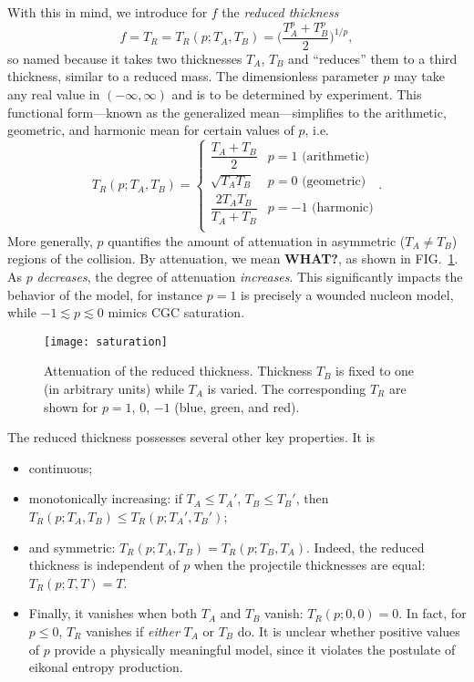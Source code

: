 \documentclass[aps,prl,reprint,amsmath,nofootinbib]{revtex4-1}
\begin{document}
With this in mind, we introduce for $f$ the \emph{reduced thickness}
\begin{equation}
  f = T_R = T_R(p; T_A, T_B) = \biggl( \frac{T_A^p + T_B^p}{2} \biggr)^{1/p},
\end{equation}
so named because it takes two thicknesses $T_A$, $T_B$ and ``reduces'' them to a third thickness, similar to a
reduced mass.  The dimensionless parameter $p$ may take any real value in $(-\infty, \infty)$ and is to be
determined by experiment.  This functional form---known as the generalized mean---simplifies to the arithmetic,
geometric, and harmonic mean for certain values of $p$, i.e.
\begin{equation}
  T_R(p; T_A, T_B) =
  \begin{cases}
    \dfrac{T_A + T_B}{2} & p = 1 \text{ (arithmetic)} \\[2ex]
    \sqrt{T_A T_B} & p = 0 \text{ (geometric)} \\[2ex]
    \dfrac{2 T_A T_B}{T_A + T_B} & p = -1 \text{ (harmonic)} \\
  \end{cases}.
\end{equation}
More generally, $p$ quantifies the amount of attenuation in asymmetric ($T_A \neq T_B$) regions of the
collision.  By attenuation, we mean \textbf{WHAT?}, as shown in FIG.~\ref{fig:saturation}.  As $p$
\emph{decreases}, the degree of attenuation \emph{increases}.  This significantly impacts the behavior of the
model, for instance $p=1$ is precisely a wounded nucleon model, while $-1 \lesssim p \lesssim 0$ mimics CGC
saturation.

\begin{figure}[t]
  \texttt{[image: saturation]}
  \caption{
    \label{fig:saturation}
    Attenuation of the reduced thickness.  Thickness $T_B$ is fixed to one (in arbitrary units) while $T_A$ is
    varied.  The corresponding $T_R$ are shown for $p = 1$, 0, $-1$ (blue, green, and red).
  }
\end{figure}

The reduced thickness possesses several other key properties.  It is
\begin{itemize}
  \item continuous;
  \item monotonically increasing:  if
    $T_A \leq T_A'$, $T_B \leq T_B'$, then
    $T_R(p; T_A, T_B) \leq T_R(p; T_A', T_B')$;
  \item and symmetric:
    $T_R(p; T_A, T_B) = T_R(p; T_B, T_A)$.
    Indeed, the reduced thickness is independent of $p$ when the projectile thicknesses are equal:
    $T_R(p; T, T) = T$.
  \item Finally, it vanishes when both $T_A$ and $T_B$ vanish: $T_R(p; 0, 0) = 0$.
    In fact, for $p \leq 0$, $T_R$ vanishes if \emph{either} $T_A$ or $T_B$ do.  It is unclear whether
    positive values of $p$ provide a physically meaningful model, since it violates the postulate of eikonal
    entropy production.
\end{itemize}
\end{document}
